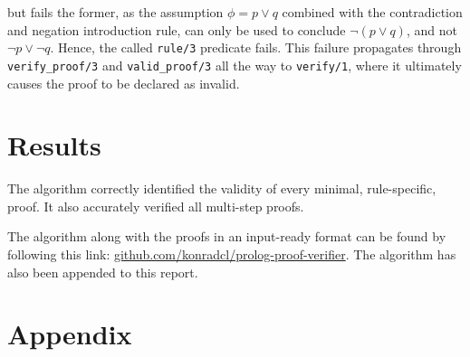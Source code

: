 \documentclass[a4paper, 11pt]{article}
\begin{document}
   but fails the former, as the assumption $\phi = p \vee q$
   combined with the contradiction and negation introduction 
   rule, can only be used to conclude $\neg (p \vee q)$, and
   not $\neg p \vee \neg q$. Hence, the called
   \texttt{rule/3} predicate fails. This failure propagates
   through \texttt{verify\_proof/3} and 
   \texttt{valid\_proof/3} all the way to \texttt{verify/1},
   where it ultimately causes the proof to be declared as
   invalid.

   \section{Results}
   The algorithm correctly identified the validity of every
   minimal, rule-specific, proof. It also accurately verified
   all multi-step proofs.
   \bigbreak

   The algorithm along with the proofs in an input-ready
   format can be found by following this link: 
   \url{github.com/konradcl/prolog-proof-verifier}. The
   algorithm has also been appended to this report.

   \newpage
   \section*{Appendix}
   
\end{document}
